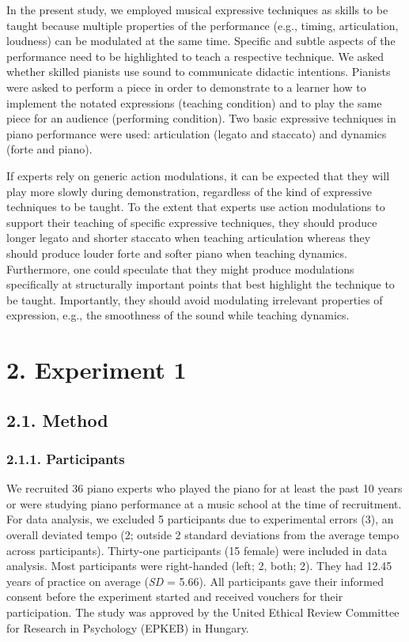 \documentclass[
  english,
  man,floatsintext]{apa6}
\begin{document}
In the present study, we employed musical expressive techniques as skills to be taught because multiple properties of the performance (e.g., timing, articulation, loudness) can be modulated at the same time. Specific and subtle aspects of the performance need to be highlighted to teach a respective technique. We asked whether skilled pianists use sound to communicate didactic intentions. Pianists were asked to perform a piece in order to demonstrate to a learner how to implement the notated expressions (teaching condition) and to play the same piece for an audience (performing condition). Two basic expressive techniques in piano performance were used: articulation (legato and staccato) and dynamics (forte and piano).

If experts rely on generic action modulations, it can be expected that they will play more slowly during demonstration, regardless of the kind of expressive techniques to be taught. To the extent that experts use action modulations to support their teaching of specific expressive techniques, they should produce longer legato and shorter staccato when teaching articulation whereas they should produce louder forte and softer piano when teaching dynamics. Furthermore, one could speculate that they might produce modulations specifically at structurally important points that best highlight the technique to be taught. Importantly, they should avoid modulating irrelevant properties of expression, e.g., the smoothness of the sound while teaching dynamics.

\clearpage

\hypertarget{experiment-1}{%
\section{2. Experiment 1}\label{experiment-1}}

\hypertarget{method}{%
\subsection{2.1. Method}\label{method}}

\hypertarget{participants}{%
\subsubsection{2.1.1. Participants}\label{participants}}

We recruited 36 piano experts who played the piano for at least the past 10 years or were studying piano performance at a music school at the time of recruitment. For data analysis, we excluded 5 participants due to experimental errors (3), an overall deviated tempo (2; outside 2 standard deviations from the average tempo across participants). Thirty-one participants (15 female) were included in data analysis. Most participants were right-handed (left; 2, both; 2). They had 12.45 years of practice on average (\emph{SD} = 5.66). All participants gave their informed consent before the experiment started and received vouchers for their participation. The study was approved by the United Ethical Review Committee for Research in Psychology (EPKEB) in Hungary.
\end{document}
